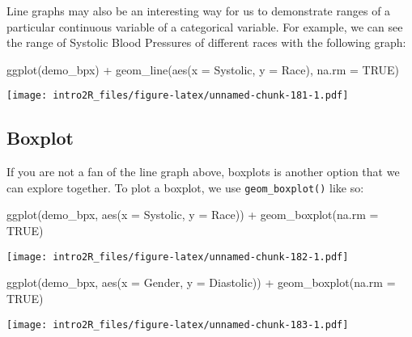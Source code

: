 \documentclass[
]{book}
\newenvironment{Shaded}{\begin{snugshade}}{\end{snugshade}}
\newcommand{\AttributeTok}[1]{\textcolor[rgb]{0.77,0.63,0.00}{#1}}
\newcommand{\ConstantTok}[1]{\textcolor[rgb]{0.00,0.00,0.00}{#1}}
\newcommand{\FunctionTok}[1]{\textcolor[rgb]{0.00,0.00,0.00}{#1}}
\newcommand{\NormalTok}[1]{#1}
\newcommand{\SpecialCharTok}[1]{\textcolor[rgb]{0.00,0.00,0.00}{#1}}
\begin{document}
Line graphs may also be an interesting way for us to demonstrate ranges of a particular continuous variable of a categorical variable. For example, we can see the range of Systolic Blood Pressures of different races with the following graph:

\begin{Shaded}
\begin{Highlighting}[]
\FunctionTok{ggplot}\NormalTok{(demo\_bpx) }\SpecialCharTok{+}
    \FunctionTok{geom\_line}\NormalTok{(}\FunctionTok{aes}\NormalTok{(}\AttributeTok{x =}\NormalTok{ Systolic, }\AttributeTok{y =}\NormalTok{ Race), }\AttributeTok{na.rm =} \ConstantTok{TRUE}\NormalTok{)}
\end{Highlighting}
\end{Shaded}

\texttt{[image: intro2R\_files/figure-latex/unnamed-chunk-181-1.pdf]}

\hypertarget{boxplot}{%
\subsection{Boxplot}\label{boxplot}}

If you are not a fan of the line graph above, boxplots is another option that we can explore together. To plot a boxplot, we use \texttt{geom\_boxplot()} like so:

\begin{Shaded}
\begin{Highlighting}[]
\FunctionTok{ggplot}\NormalTok{(demo\_bpx, }\FunctionTok{aes}\NormalTok{(}\AttributeTok{x =}\NormalTok{ Systolic, }\AttributeTok{y =}\NormalTok{ Race)) }\SpecialCharTok{+}
  \FunctionTok{geom\_boxplot}\NormalTok{(}\AttributeTok{na.rm =} \ConstantTok{TRUE}\NormalTok{)}
\end{Highlighting}
\end{Shaded}

\texttt{[image: intro2R\_files/figure-latex/unnamed-chunk-182-1.pdf]}

\begin{Shaded}
\begin{Highlighting}[]
\FunctionTok{ggplot}\NormalTok{(demo\_bpx, }\FunctionTok{aes}\NormalTok{(}\AttributeTok{x =}\NormalTok{ Gender, }\AttributeTok{y =}\NormalTok{ Diastolic)) }\SpecialCharTok{+}
  \FunctionTok{geom\_boxplot}\NormalTok{(}\AttributeTok{na.rm =} \ConstantTok{TRUE}\NormalTok{)}
\end{Highlighting}
\end{Shaded}

\texttt{[image: intro2R\_files/figure-latex/unnamed-chunk-183-1.pdf]}
\end{document}

